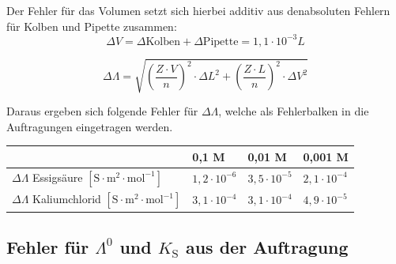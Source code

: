 \documentclass[12pt,a4paper,titlepage,headinclude,bibtotoc]{scrartcl}
\begin{document}
Der Fehler für das Volumen setzt sich hierbei additiv aus denabsoluten Fehlern für Kolben und Pipette zusammen:\\

\begin{equation}
\Delta V = \Delta \mathrm{Kolben} + \Delta \mathrm{Pipette} = 1,1 \cdot 10^{-3} L
\end{equation}




\begin{equation}
\Delta \Lambda = \sqrt{\left(\frac{Z \cdot V}{n}\right)^2 \cdot {\Delta L}^2 + \left(\frac{Z \cdot L}{n}\right)^2 \cdot \Delta V^2}
\end{equation}

Daraus ergeben sich folgende Fehler für $\Delta \Lambda$, welche als Fehlerbalken in die Auftragungen eingetragen werden.\\

\begin{table} [h]
\centering 
\begin{tabular}{|p{7cm}||p{2cm}|p{2cm}|p{2cm}|}
\hline
& 0,1 M & 0,01 M & 0,001 M \\
\hline
$\Delta \Lambda$ Essigsäure $[\mathrm{S \cdot m^{2} \cdot mol^{-1}}]$ & $1,2 \cdot 10^{-6}$ & $3,5 \cdot 10^{-5}$& $2,1 \cdot 10^{-4}$ \\
\hline
$\Delta \Lambda$ Kaliumchlorid $[\mathrm{S \cdot m^{2} \cdot mol^{-1}}]$ &$3,1 \cdot 10^{-4}$ & $3,1 \cdot 10^{-4}$ & $4,9 \cdot 10^{-5}$ \\
\hline
\end{tabular}
\end{table}





\newpage

\subsection{Fehler für $\Lambda^0$ und $K_{\mathrm{S}}$ aus der Auftragung}
\end{document}
